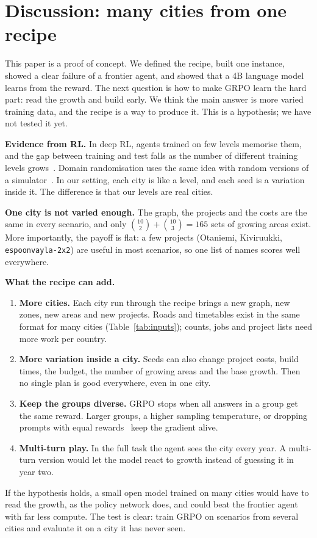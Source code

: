 \documentclass{article}
\begin{document}
\section{Discussion: many cities from one recipe}\label{sec:scale}

This paper is a proof of concept. We defined the recipe, built one instance, showed a clear failure of a frontier agent, and showed that a 4B language model learns from the reward. The next question is how to make GRPO learn the hard part: read the growth and build early. We think the main answer is more varied training data, and the recipe is a way to produce it. This is a hypothesis; we have not tested it yet.

\textbf{Evidence from RL.} In deep RL, agents trained on few levels memorise them, and the gap between training and test falls as the number of different training levels grows~\cite{zhang2018,cobbe2019,cobbe2020,kirk2023}. Domain randomisation uses the same idea with random versions of a simulator~\cite{tobin2017}. In our setting, each city is like a level, and each seed is a variation inside it. The difference is that our levels are real cities.

\textbf{One city is not varied enough.} The graph, the projects and the costs are the same in every scenario, and only $\binom{10}{2}+\binom{10}{3}=165$ sets of growing areas exist. More importantly, the payoff is flat: a few projects (Otaniemi, Kiviruukki, \texttt{espoonvayla-2x2}) are useful in most scenarios, so one list of names scores well everywhere.

\textbf{What the recipe can add.}
\begin{enumerate}
\item \textbf{More cities.} Each city run through the recipe brings a new graph, new zones, new areas and new projects. Roads and timetables exist in the same format for many cities (Table~\ref{tab:inputs}); counts, jobs and project lists need more work per country.
\item \textbf{More variation inside a city.} Seeds can also change project costs, build times, the budget, the number of growing areas and the base growth. Then no single plan is good everywhere, even in one city.
\item \textbf{Keep the groups diverse.} GRPO stops when all answers in a group get the same reward. Larger groups, a higher sampling temperature, or dropping prompts with equal rewards~\cite{yu2025} keep the gradient alive.
\item \textbf{Multi-turn play.} In the full task the agent sees the city every year. A multi-turn version would let the model react to growth instead of guessing it in year two.
\end{enumerate}
If the hypothesis holds, a small open model trained on many cities would have to read the growth, as the policy network does, and could beat the frontier agent with far less compute. The test is clear: train GRPO on scenarios from several cities and evaluate it on a city it has never seen.
\end{document}
